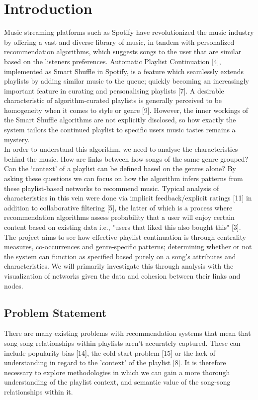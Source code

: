 \documentclass[conference]{IEEEtran}
\begin{document}
\section{Introduction}
Music streaming platforms such as Spotify have revolutionized the music industry by offering a vast and diverse library of music, in tandem with personalized recommendation algorithms, which suggests songs to the user that are similar based on the listeners preferences. Automatic Playlist Continuation [4], implemented as Smart Shuffle in Spotify, is a feature which seamlessly extends playlists by adding similar music to the queue; quickly becoming an increasingly important feature in curating and personalising playlists [7]. A desirable characteristic of algorithm-curated playlists is generally perceived to be homogeneity when it comes to style or genre [9]. However, the inner workings of the Smart Shuffle algorithms are not explicitly disclosed, so how exactly the system tailors the continued playlist to specific users music tastes remains a mystery. \\

In order to understand this algorithm, we need to analyse the characteristics behind the music. How are links between how songs of the same genre grouped? Can the ‘context’ of a playlist can be defined based on the genres alone? By asking these questions we can focus on how the algorithm infers patterns from these playlist-based networks to recommend music. Typical analysis of characteristics in this vein were done via implicit feedback/explicit ratings [11] in addition to collaborative filtering [5], the latter of which is a process where recommendation algorithms assess probability that a user will enjoy certain content based on existing data i.e., "users that liked this also bought this" [3]. The project aims to see how effective playlist continuation is through centrality measures, co-occurrences and genre-specific patterns; determining whether or not the system can function as specified based purely on a song’s attributes and characteristics. We will primarily investigate this through analysis with the visualization of networks given the data and cohesion between their links and nodes. 

\subsection{Problem Statement}

There are many existing problems with recommendation systems that mean that song-song relationships within playlists aren't accurately captured. These can include popularity bias [14], the cold-start problem [15] or the lack of understanding in regard to the 'context' of the playlist [8]. It is therefore necessary to explore methodologies in which we can gain a more thorough understanding of the playlist context, and semantic value of the song-song relationships within it. \\
\end{document}
